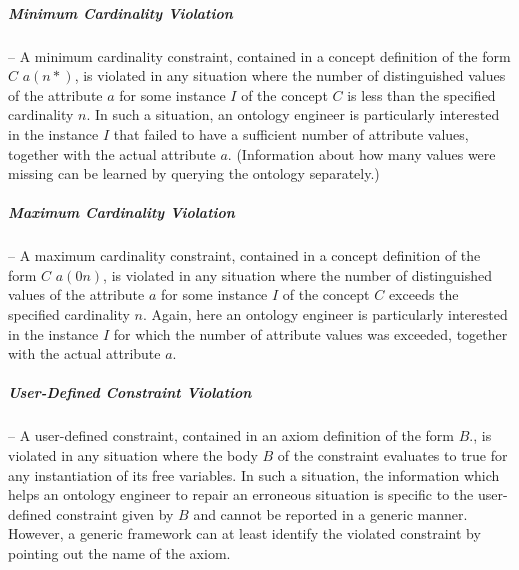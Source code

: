 \subparagraph{Minimum Cardinality Violation} -- A minimum
cardinality constraint, contained in a concept definition of the
form  $C$ $a (n *)$, is violated in any situation
where the number of distinguished values of the attribute $a$ for
some instance $I$ of the concept $C$ is less than the specified
cardinality $n$. In such a situation, an ontology engineer is
particularly interested in the instance $I$ that failed to have a
sufficient number of attribute values, together with the actual
attribute $a$. (Information about how many values were missing can
be learned by querying the ontology separately.)

\subparagraph{Maximum Cardinality Violation} -- A maximum
cardinality constraint, contained in a concept definition of the
form  $C$ $a (0 n)$, is violated in any situation
where the number of distinguished values of the attribute $a$ for
some instance $I$ of the concept $C$ exceeds the specified
cardinality $n$. Again, here an ontology engineer is particularly
interested in the instance $I$ for which the number of attribute
values was exceeded, together with the actual attribute $a$.

\subparagraph{User-Defined Constraint Violation} -- A user-defined
constraint, contained in an axiom definition of the form
 \axiomid {} $B.$, is violated in any
situation where the body $B$ of the constraint evaluates to true
for any instantiation of its free variables. In such a situation,
the information which helps an ontology engineer to repair an
erroneous situation is specific to the user-defined constraint
given by $B$ and cannot be reported in a generic manner. However,
a generic framework can at least identify the violated constraint
by pointing out the name \axiomid of the axiom.

